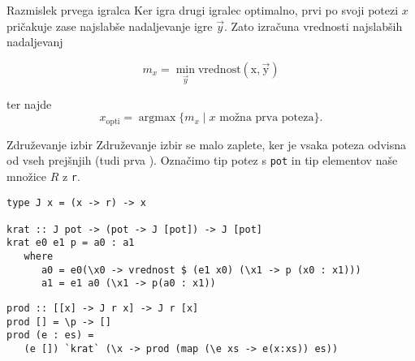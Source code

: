 \documentclass{beamer}
\newcommand{\argmax}{\operatorname{argmax}}
\begin{document}
\begin{frame}{Razmislek prvega igralca}
Ker igra drugi igralec optimalno, prvi po svoji potezi $x$ pričakuje zase najslabše nadaljevanje igre $\vec{y}$. Zato izračuna vrednosti najslabših nadaljevanj

$$m_x =\min_{\vec{y}} \operatorname{vrednost(x,\vec{y})}$$

ter najde $$x_{\text{opti}} = \argmax \{m_x\mid x \text{ možna prva poteza} \}\text{.}$$



\end{frame}

\begin{frame}[fragile]{Združevanje izbir}%
Združevanje izbir se malo zaplete, ker je vsaka poteza odvisna od vseh prejšnjih (tudi prva \smiley).
Označimo tip potez s \texttt{pot} in tip elementov naše množice $R$ z \texttt{r}.
\pause
\begin{lstlisting}
type J x = (x -> r) -> x

krat :: J pot -> (pot -> J [pot]) -> J [pot]
krat e0 e1 p = a0 : a1
   where
      a0 = e0(\x0 -> vrednost $ (e1 x0) (\x1 -> p (x0 : x1)))
      a1 = e1 a0 (\x1 -> p(a0 : x1))
\end{lstlisting}
\pause
\begin{lstlisting}
prod :: [[x] -> J r x] -> J r [x]
prod [] = \p -> []
prod (e : es) =  
   (e []) `krat` (\x -> prod (map (\e xs -> e(x:xs)) es))
\end{lstlisting}
\end{frame}
\end{document}
